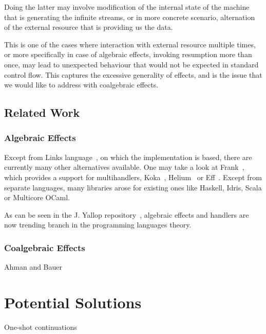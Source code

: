 \documentclass[declaration,shortabstract]{iithesis}
\theoremstyle{definition} \newtheorem{definition}{Definition}[chapter]
\theoremstyle{remark} \newtheorem{remark}[definition]{Observation}
\theoremstyle{plain} \newtheorem{theorem}[definition]{Theorem}
\theoremstyle{plain} \newtheorem{lemma}[definition]{Lemma}
\begin{document}
    Doing the latter may involve modification of the internal state of the machine
    that is generating the infinite streams, or in more concrete scenario,
    alternation of the external resource that is providing us the data.

    This is one of the cases where interaction with external resource multiple
    times, or more specifically in case of algebraic effects, invoking resumption more
    than once, may lead to unexpected behaviour that would not be expected in standard
    control flow. This captures the excessive generality of effects, and is the
    issue that we would like to address with coalgebraic effects.



\section{Related Work}
    \subsection{Algebraic Effects}

    Except from Links language~\cite{handlers-cps}, on which the implementation
    is based, there are currently many other alternatives available. One may take
    a look at Frank~\cite{frank}, which provides a support for multihandlers,
    Koka~\cite{leijen-koka}, Helium~\cite{helium} or Eff~\cite{eff}. Except from
    separate languages, many libraries arose for existing ones like Haskell,
    Idris, Scala or Multicore OCaml.

    As can be seen in the J. Yallop repository~\cite{effects-bibliography}, algebraic
    effects and handlers are now trending branch in the programming languages theory.

    \subsection{Coalgebraic Effects}

    Ahman and Bauer~\cite{runners-in-action}


\chapter{Potential Solutions}

One-shot continuations
\end{document}
